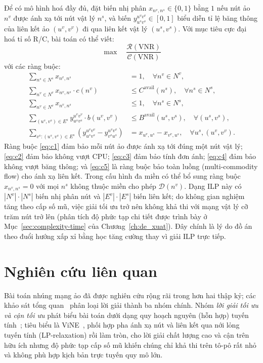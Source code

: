 \documentclass[../DoAn.tex]{subfiles}
\begin{document}
Để có mô hình hoá đầy đủ, đặt biến nhị phân $x_{n^v, n^s} \in \{0,1\}$ bằng $1$ nếu nút ảo $n^v$ được ánh xạ tới nút vật lý $n^s$, và biến $y^{u^v v^v}_{u^s v^s} \in [0, 1]$ biểu diễn tỉ lệ băng thông của liên kết ảo $(u^v, v^v)$ đi qua liên kết vật lý $(u^s, v^s)$. Với mục tiêu cực đại hoá tỉ số R/C, bài toán có thể viết:
\begin{equation}
    \max \quad \frac{\mathcal{R}(\text{VNR})}{\mathcal{C}(\text{VNR})}
\end{equation}
với các ràng buộc:
\begin{align}
    \sum_{n^s \in N^s} x_{n^v, n^s} &= 1, \quad \forall n^v \in N^v, \label{eq:c1}\\
    \sum_{n^v \in N^v} x_{n^v, n^s} \cdot c(n^v) &\leq C^{\text{avail}}(n^s), \quad \forall n^s \in N^s, \label{eq:c2}\\
    \sum_{n^v \in N^v} x_{n^v, n^s} &\leq 1, \quad \forall n^s \in N^s, \label{eq:c3}\\
    \sum_{(u^s, v^s) \in E^s} y^{u^v v^v}_{u^s v^s} \cdot b(u^v, v^v) &\leq B^{\text{avail}}(u^s, v^s), \quad \forall (u^s, v^s), \label{eq:c4}\\
    \sum_{v^s : (u^s, v^s) \in E^s} (y^{u^v v^v}_{u^s v^s} - y^{u^v v^v}_{v^s u^s}) &= x_{u^v, u^s} - x_{v^v, u^s}, \quad \forall u^s, (u^v, v^v). \label{eq:c5}
\end{align}
Ràng buộc \eqref{eq:c1} đảm bảo mỗi nút ảo được ánh xạ tới đúng một nút vật lý; \eqref{eq:c2} đảm bảo không vượt CPU; \eqref{eq:c3} đảm bảo tính đơn ánh; \eqref{eq:c4} đảm bảo không vượt băng thông; và \eqref{eq:c5} là ràng buộc bảo toàn luồng (multi-commodity flow) cho ánh xạ liên kết. Trong cấu hình đa miền có thể bổ sung ràng buộc $x_{n^v,n^s}=0$ với mọi $n^s$ không thuộc miền cho phép $\mathcal{D}(n^v)$. Dạng ILP này có $|N^v| \cdot |N^s|$ biến nhị phân nút và $|E^v| \cdot |E^s|$ biến liên kết; do không gian nghiệm tăng theo cấp số mũ, việc giải tối ưu trở nên không khả thi với mạng vật lý cỡ trăm nút trở lên (phân tích độ phức tạp chi tiết được trình bày ở Mục~\ref{sec:complexity-time} của Chương~\ref{ch:de_xuat}). Đây chính là lý do đồ án theo đuổi hướng xấp xỉ bằng học tăng cường thay vì giải ILP trực tiếp.

\section{Nghiên cứu liên quan}
\label{sec:approaches}

Bài toán nhúng mạng ảo đã được nghiên cứu rộng rãi trong hơn hai thập kỷ; các khảo sát tổng quan~\cite{fischer2013vne_survey, cao2019vne_survey} phân loại lời giải thành ba nhóm chính. Nhóm \textit{lời giải tối ưu và cận tối ưu} phát biểu bài toán dưới dạng quy hoạch nguyên (hỗn hợp) tuyến tính~\cite{andersen2002theoretical, zhu2006algorithms}; tiêu biểu là ViNE~\cite{chowdhury2009vine}, phối hợp pha ánh xạ nút và liên kết qua nới lỏng tuyến tính (LP-relaxation) rồi làm tròn, cho lời giải chất lượng cao và cận trên hữu ích nhưng độ phức tạp cấp số mũ khiến chúng chỉ khả thi trên tô-pô rất nhỏ và không phù hợp kịch bản trực tuyến quy mô lớn.
\end{document}
